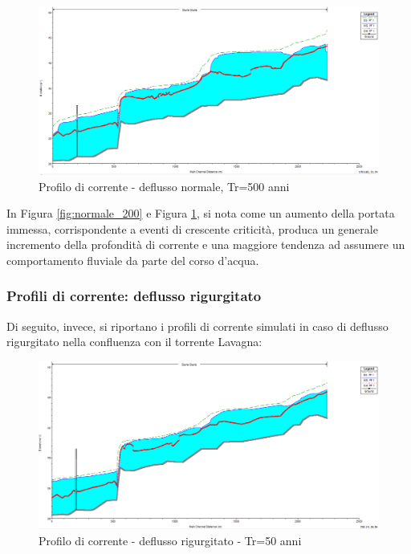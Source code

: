 \documentclass[12pt]{article} %
\begin{document}
\begin{figure}[H]
    \centering
    \includegraphics[scale=0.5]{ProfU1223.PNG}
    \caption{Profilo di corrente - deflusso normale, Tr=500 anni}
    \label{fig:normale_500}
\end{figure}

\noindent In Figura \ref{fig:normale_200} e Figura \ref{fig:normale_500}, si nota come un aumento della portata immessa, corrispondente a eventi di crescente criticità, produca un generale incremento della profondità di corrente e una maggiore tendenza ad assumere un comportamento fluviale da parte del corso d'acqua.


\subsubsection{Profili di corrente: deflusso rigurgitato}
\noindent Di seguito, invece, si riportano i profili di corrente simulati in caso di deflusso rigurgitato nella confluenza con il torrente Lavagna:

\begin{figure}[H]
    \centering
    \includegraphics[scale=0.5]{Prof56.PNG}
    \caption{Profilo di corrente - deflusso rigurgitato - Tr=50 anni}
\end{figure}
\end{document}
